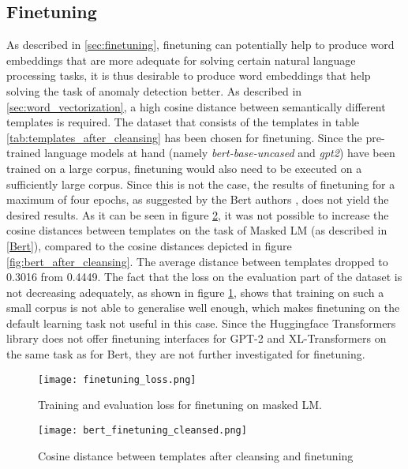 \subsection{Finetuning}
As described in \ref{sec:finetuning}, finetuning can potentially help to produce word embeddings that are more adequate for solving certain natural language processing tasks, it is thus desirable to produce word embeddings that help solving the task of anomaly detection better. As described in \ref{sec:word_vectorization}, a high cosine distance between semantically different templates is required. The dataset that consists of the templates in table \ref{tab:templates_after_cleansing} has been chosen for finetuning. Since the pre-trained language models at hand (namely \textit{bert-base-uncased} and \textit{gpt2}) have been trained on a large corpus, finetuning would also need to be executed on a sufficiently large corpus. Since this is not the case, the results of finetuning for a maximum of four epochs, as suggested by the Bert authors \cite{devlin2018bert}, does not yield the desired results. As it can be seen in figure \ref{fig:cos_distance_finetuning}, it was not possible to increase the cosine distances between templates on the task of Masked LM (as described in \ref{Bert}), compared to the cosine distances depicted in figure \ref{fig:bert_after_cleansing}. The average distance between templates dropped to 0.3016 from 0.4449. The fact that the loss on the evaluation part of the dataset is not decreasing adequately, as shown in figure \ref{fig:finetuning_loss}, shows that training on such a small corpus is not able to generalise well enough, which makes finetuning on the default learning task not useful in this case. Since the Huggingface Transformers library does not offer finetuning interfaces for GPT-2 and XL-Transformers on the same task as for Bert, they are not further investigated for finetuning.

\begin{figure}[H]
  \centering
  \texttt{[image: finetuning\_loss.png]}\\
  \caption{Training and evaluation loss for finetuning on masked LM.}
  \label{fig:finetuning_loss}
\end{figure}

\begin{figure}[h]
  \centering
  \texttt{[image: bert\_finetuning\_cleansed.png]}\\
  \caption{Cosine distance between templates after cleansing and finetuning}
  \label{fig:cos_distance_finetuning}
\end{figure}


